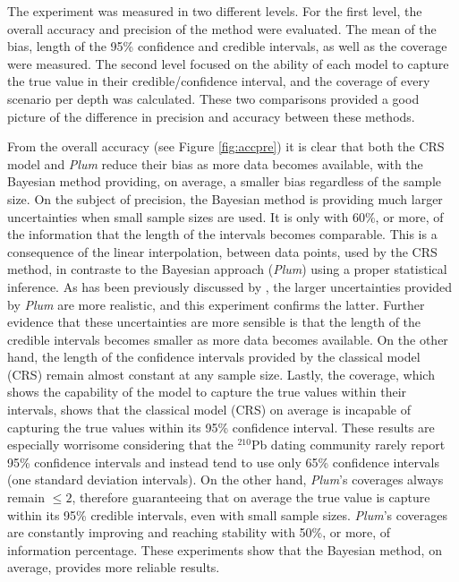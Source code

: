 \documentclass [10pt] {article}
\begin{document}
The experiment was measured in two different levels.
For the first level, the overall accuracy and precision of the method were evaluated.
The mean of the bias, length of the 95\% confidence and credible intervals, as well as the coverage were measured.
The second level focused on the ability of each model to capture the true value in their credible/confidence interval, and the coverage of every scenario per depth was calculated. 
These two comparisons provided a good picture of the difference in precision and accuracy between these methods.

From the overall accuracy (see Figure \ref{fig:accpre}) it is clear that both the CRS model and \textit{Plum} reduce their bias as more data becomes available, with the Bayesian method providing, on average, a smaller bias regardless of the sample size. 
On the subject of precision, the Bayesian method is providing much larger uncertainties when small sample sizes are used. 
It is only with 60\%, or more, of the information that the length of the intervals becomes comparable. 
This is a consequence of the linear interpolation, between data points, used by the CRS method, in contraste to the Bayesian approach (\textit{Plum}) using a proper statistical inference.  
As has been previously discussed by \citet{Aquino2020}, the larger uncertainties provided by \textit{Plum} are more realistic, and this experiment confirms the latter.
Further evidence that these uncertainties are more sensible is that the length of the credible intervals becomes smaller as more data becomes available. 
On the other hand, the length of the confidence intervals provided by the classical model (CRS) remain almost constant at any sample size.
Lastly, the coverage, which shows the capability of the model to capture the true values within their intervals, shows that the classical model (CRS) on average is incapable of capturing the true values within its 95\% confidence interval. 
These results are especially worrisome considering that the $^{210}$Pb dating community rarely report 95\% confidence intervals and instead tend to use only 65\% confidence intervals (one standard deviation intervals).
On the other hand, \textit{Plum}'s coverages always remain $\leq 2$, therefore guaranteeing that on average the true value is capture within its 95\% credible intervals, even with small sample sizes.
\textit{Plum}'s coverages are constantly improving and reaching stability with 50\%, or more, of information percentage.
These experiments show that the Bayesian method, on average, provides more reliable results.
\end{document}
